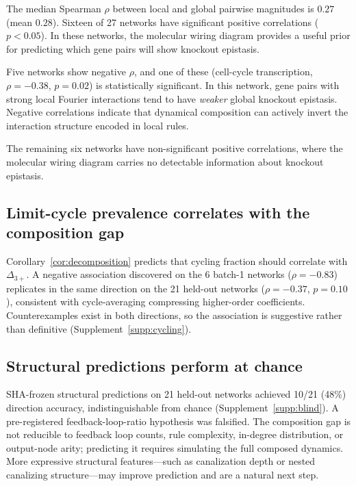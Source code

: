 \documentclass[10pt]{article}
\begin{document}
The median Spearman $\rho$ between local and global pairwise
magnitudes is $0.27$ (mean $0.28$). Sixteen of 27 networks have
significant positive correlations ($p < 0.05$). In these networks,
the molecular wiring diagram provides a useful prior for predicting
which gene pairs will show knockout epistasis.

Five networks show negative $\rho$, and one of these
(cell-cycle transcription, $\rho = -0.38$, $p = 0.02$) is
statistically significant. In this network, gene pairs with strong
local Fourier interactions tend to have \emph{weaker} global knockout
epistasis. Negative correlations indicate that dynamical composition
can actively invert the interaction structure encoded in local rules.

The remaining six networks have non-significant positive
correlations, where the molecular wiring diagram carries no detectable
information about knockout epistasis.


\subsection{Limit-cycle prevalence correlates with the composition gap}
\label{sec:cycling}

Corollary~\ref{cor:decomposition} predicts that cycling fraction
should correlate with $\Delta_{3+}$. A negative association
discovered on the 6 batch-1 networks ($\rho = -0.83$) replicates in
the same direction on the 21 held-out networks ($\rho = -0.37$,
$p = 0.10$), consistent with cycle-averaging compressing
higher-order coefficients. Counterexamples exist in both directions,
so the association is suggestive rather than definitive
(Supplement~\ref{supp:cycling}).


\subsection{Structural predictions perform at chance}
\label{sec:blind-results}

SHA-frozen structural predictions on 21 held-out networks achieved
10/21 (48\%) direction accuracy, indistinguishable from chance
(Supplement~\ref{supp:blind}). A pre-registered feedback-loop-ratio
hypothesis was falsified. The composition gap is not reducible to
feedback loop counts, rule complexity, in-degree distribution, or
output-node arity; predicting it requires simulating the full
composed dynamics. More expressive structural features---such as
canalization depth or nested canalizing
structure---may improve prediction and are a natural next step.
\end{document}
